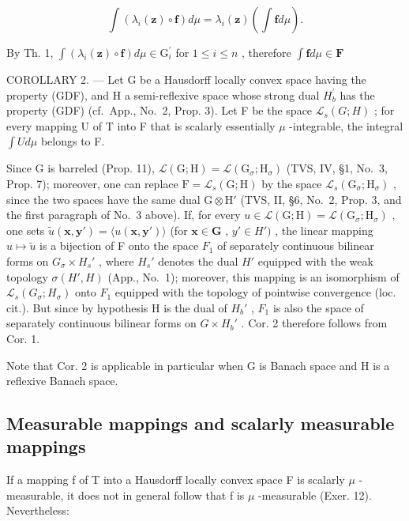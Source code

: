 \[
\int \left(\lambda_ {i} (\mathbf {z}) \circ \mathbf {f}\right) d \mu = \lambda_ {i} (\mathbf {z}) \left(\int \mathbf {f} d \mu\right).
\]

By Th. 1, \(\int (\lambda_i(\mathbf{z})\circ \mathbf{f})d\mu \in \mathrm{G}_i^\prime\) for \(1\leqslant i\leqslant n\) , therefore \(\int \mathbf{f}d\mu \in \mathbf{F}\)

COROLLARY 2. --- Let G be a Hausdorff locally convex space having the property (GDF), and H a semi-reflexive space whose strong dual \(H_{b}^{\prime}\) has the property (GDF) (cf.~App., No.~2, Prop. 3). Let F be the space \(\mathcal{L}_{s}(G;H)\) ; for every mapping U of T into F that is scalarly essentially \(\mu\) -integrable, the integral \(\int U d\mu\) belongs to F.

Since G is barreled (Prop. 11), \(\mathcal{L}(\mathrm{G};\mathrm{H}) = \mathcal{L}(\mathrm{G}_{\sigma};\mathrm{H}_{\sigma})\) (TVS, IV, §1, No.~3, Prop. 7); moreover, one can replace \(\mathrm{F} = \mathcal{L}_s(\mathrm{G};\mathrm{H})\) by the space \(\mathcal{L}_s(\mathrm{G}_{\sigma};\mathrm{H}_{\sigma})\) , since the two spaces have the same dual \(\mathrm{G} \otimes \mathrm{H}'\) (TVS, II, §6, No.~2, Prop. 3, and the first paragraph of No.~3 above). If, for every \(u \in \mathcal{L}(\mathrm{G};\mathrm{H}) = \mathcal{L}(\mathrm{G}_{\sigma};\mathrm{H}_{\sigma})\) , one sets \(\widetilde{u}(\mathbf{x},\mathbf{y}') = \langle u(\mathbf{x},\mathbf{y}') \rangle\) (for \(\mathbf{x} \in \mathbf{G}\) , \(y' \in H')\) , the linear mapping \(u \mapsto \widetilde{u}\) is a bijection of F onto the space \(F_1\) of separately continuous bilinear forms on \(G_\sigma \times H_s'\) , where \(H_s'\) denotes the dual \(H'\) equipped with the weak topology \(\sigma(H', H)\) (App., No.~1); moreover, this mapping is an isomorphism of \(\mathcal{L}_s(G_\sigma; H_\sigma)\) onto \(F_1\) equipped with the topology of pointwise convergence (loc. cit.). But since by hypothesis H is the dual of \(H_b'\) , \(F_1\) is also the space of separately continuous bilinear forms on \(G \times H_b'\) . Cor. 2 therefore follows from Cor. 1.

Note that Cor. 2 is applicable in particular when G is Banach space and H is a reflexive Banach space.

\subsection{Measurable mappings and scalarly measurable mappings}

If a mapping f of T into a Hausdorff locally convex space F is scalarly \(\mu\) -measurable, it does not in general follow that f is \(\mu\) -measurable (Exer. 12). Nevertheless:

